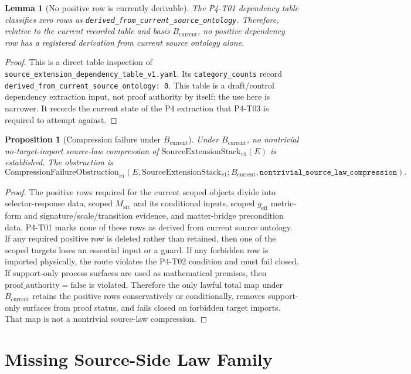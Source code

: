 \documentclass[11pt]{article}
\newcommand{\geff}{g_{\mathrm{eff}}}
\newcommand{\Msrc}{M_{\mathrm{src}}}
\newcommand{\Stack}{\mathrm{SourceExtensionStack}_{v1}}
\newcommand{\NoTargetImport}{\mathrm{NoTargetImport}}
\newcommand{\Obstruction}{\mathrm{CompressionFailureObstruction}_{v1}}
\newcommand{\Bcur}{B_{\mathrm{current}}}
\newcommand{\ProofAuthFalse}{\mathrm{proof\_authority=false}}
\newtheorem{lemma}{Lemma}
\newtheorem{proposition}{Proposition}
\begin{document}
\begin{lemma}[No positive row is currently derivable]
The P4-T01 dependency table classifies zero rows as
\texttt{derived\_from\_current\_source\_ontology}. Therefore, relative to the
current recorded table and basis \(\Bcur\), no positive dependency row has a
registered derivation from current source ontology alone.
\end{lemma}

\begin{proof}
This is a direct table inspection of
\texttt{source\_extension\_dependency\_table\_v1.yaml}. Its
\texttt{category\_counts} record
\texttt{derived\_from\_current\_source\_ontology: 0}. This table is a
draft/control dependency extraction input, not proof authority by itself; the
use here is narrower. It records the current state of the P4 extraction that
P4-T03 is required to attempt against.
\end{proof}

\begin{proposition}[Compression failure under \(\Bcur\)]
Under \(\Bcur\), no nontrivial no-target-import source-law compression of
\(\Stack(E)\) is established. The obstruction is
\[
  \Obstruction(E,\Stack;\Bcur,
  \texttt{nontrivial\_source\_law\_compression}).
\]
\end{proposition}

\begin{proof}
The positive rows required for the current scoped objects divide into
selector-response data, scoped \(\Msrc\) and its conditional inputs, scoped
\(\geff\) metric-form and signature/scale/transition evidence, and
matter-bridge precondition data. P4-T01 marks none of these rows as derived
from current source ontology. If any required positive row is deleted rather
than retained, then one of the scoped targets loses an essential input or a
guard. If any forbidden row is imported physically, the route violates the
P4-T02 \NoTargetImport{} condition and must fail closed. If support-only
process surfaces are used as mathematical premises, then
\(\ProofAuthFalse\) is violated. Therefore the only lawful total map under
\(\Bcur\) retains the positive rows conservatively or conditionally, removes
support-only surfaces from proof status, and fails closed on forbidden target
imports. That map is not a nontrivial source-law compression.
\end{proof}

\section{Missing Source-Side Law Family}
\end{document}
